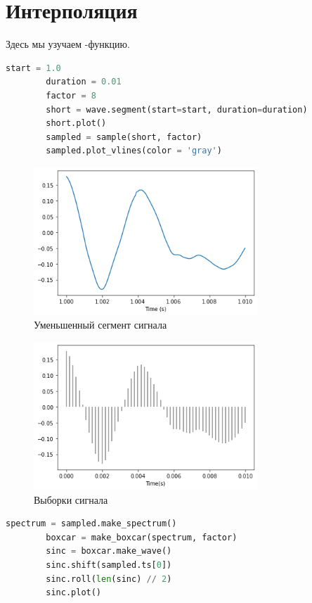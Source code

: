 \documentclass[a4paper, 12pt]{report}
\begin{document}
	\chapter{Интерполяция}
	Здесь мы узучаем -функцию.
	\begin{lstlisting}[language=Python,caption=Увеличим масштаб]
		start = 1.0
		duration = 0.01
		factor = 8
		short = wave.segment(start=start, duration=duration)
		short.plot()
		sampled = sample(short, factor)
		sampled.plot_vlines(color = 'gray')
	\end{lstlisting}
	\begin{figure}[H]
		\centering
		\includegraphics[width=0.75\textwidth]{sinc1.png}
		\caption{Уменьшенный сегмент сигнала}
		\label{fig:sinc1}
	\end{figure}
	\begin{figure}[H]
		\centering
		\includegraphics[width=0.75\textwidth]{sinc2.png}
		\caption{Выборки сигнала}
		\label{fig:sinc2}
	\end{figure}
	\begin{lstlisting}[language=Python,caption=Изменение положения sinc-функции]
		spectrum = sampled.make_spectrum()
		boxcar = make_boxcar(spectrum, factor)
		sinc = boxcar.make_wave()
		sinc.shift(sampled.ts[0])
		sinc.roll(len(sinc) // 2)
		sinc.plot()
	\end{lstlisting}
\end{document}

